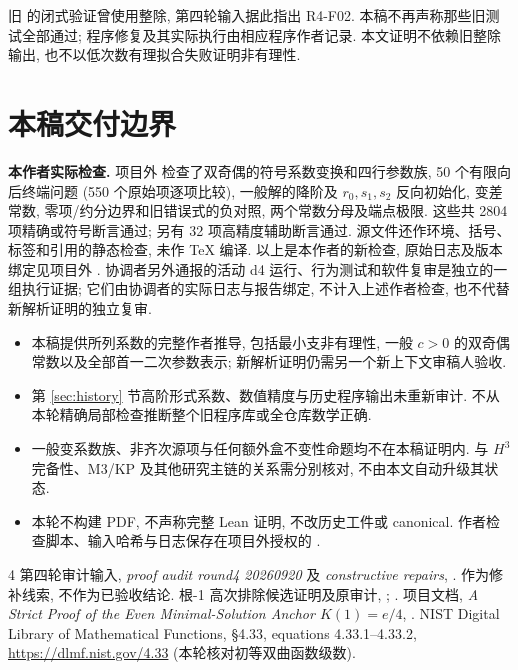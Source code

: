 \documentclass[UTF8]{ctexart}
\begin{document}
旧  的闭式验证曾使用整除,
第四轮输入据此指出 R4-F02. 本稿不再声称那些旧测试全部通过;
程序修复及其实际执行由相应程序作者记录. 本文证明不依赖旧整除输出,
也不以低次数有理拟合失败证明非有理性.

\section{本稿交付边界}

\noindent\textbf{本作者实际检查.}
项目外  检查了双奇偶的符号系数变换和四行参数族,
50 个有限向后终端问题 (550 个原始项逐项比较),
一般解的降阶及 $r_0,s_1,s_2$ 反向初始化, 变差常数,
零项/约分边界和旧错误式的负对照, 两个常数分母及端点极限.
这些共 2804 项精确或符号断言通过; 另有 32 项高精度辅助断言通过.
源文件还作环境、括号、标签和引用的静态检查, 未作 TeX 编译.
以上是本作者的新检查, 原始日志及版本绑定见项目外 .
协调者另外通报的活动 d4 运行、行为测试和软件复审是独立的一组执行证据;
它们由协调者的实际日志与报告绑定, 不计入上述作者检查,
也不代替新解析证明的独立复审.

\begin{itemize}
 \item 本稿提供所列系数的完整作者推导, 包括最小支非有理性,
 一般 $c>0$ 的双奇偶常数以及全部首一二次参数表示;
 新解析证明仍需另一个新上下文审稿人验收.
 \item 第 \ref{sec:history} 节高阶形式系数、数值精度与历史程序输出未重新审计.
 不从本轮精确局部检查推断整个旧程序库或全仓库数学正确.
 \item 一般变系数族、非齐次源项与任何额外盒不变性命题均不在本稿证明内.
 与 $H^3$ 完备性、M3/KP 及其他研究主链的关系需分别核对,
 不由本文自动升级其状态.
 \item 本轮不构建 PDF, 不声称完整 Lean 证明, 不改历史工件或 canonical.
 作者检查脚本、输入哈希与日志保存在项目外授权的
 .
\end{itemize}

\begin{thebibliography}{4}
 第四轮审计输入, \emph{proof audit round4 20260920}
 及 \emph{constructive repairs},
 .
 作为修补线索, 不作为已验收结论.
 根-1 高次排除候选证明及原审计,
 ;
 .
 项目文档, \emph{A Strict Proof of the Even Minimal-Solution
 Anchor $K(1)=e/4$}, .
 NIST Digital Library of Mathematical Functions,
 \S4.33, equations 4.33.1--4.33.2,
 \url{https://dlmf.nist.gov/4.33} (本轮核对初等双曲函数级数).
\end{thebibliography}
\end{document}
